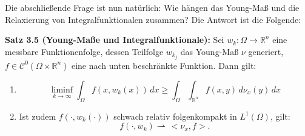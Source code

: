 Die abschließende Frage ist nun natürlich: Wie hängen das Young-Maß und die Relaxierung von Integralfunktionalen zusammen? Die Antwort ist die Folgende:\\
\colorbox{theored}{\begin{minipage}{16cm}{\textcolor{black}{}{\label{theo3.5}}}
\textbf{Satz 3.5 (Young-Maße und Integralfunktionale):} Sei \(w_k: \Omega \to \mathbb{R}^n\) eine messbare Funktionenfolge, dessen Teilfolge \(w_{k_j}\) das Young-Maß \(\nu\) generiert, \(f \in \mathcal{C}^0(\Omega \times \mathbb{R}^n)\) eine nach unten beschränkte Funktion. Dann gilt:
\begin{enumerate}
    \item \begin{equation}
        \liminf_{k \to \infty} \int_{\Omega} f(x,w_k(x))\,dx \geq \int_{\Omega} \int_{\mathbb{R}^n} f(x,y)\,d\nu_x(y)\,dx
    \end{equation}
    \item Ist zudem \(f(\cdot,w_k(\cdot))\) schwach relativ folgenkompakt in \(L^1(\Omega)\), gilt:
    \begin{equation}
        f(\cdot,w_k) \rightharpoonup \, <\nu_x,f>.
    \end{equation}
\end{enumerate}
\end{minipage}}